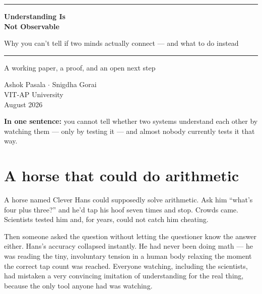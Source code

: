 \documentclass[11pt]{article}
\begin{document}
\begin{titlepage}
\centering
\vspace*{1.6cm}

{\color{accent}\rule{0.5\textwidth}{1.2pt}}

\vspace{1.4cm}
{\Huge\bfseries\color{accentdeep} Understanding Is\\[2pt] Not Observable}

\vspace{0.8cm}
{\Large\color{accent} Why you can't tell if two minds actually connect --- and what to do instead}

\vspace{1.6cm}
{\color{accent}\rule{0.5\textwidth}{1.2pt}}

\vspace{2.2cm}
{\large A working paper, a proof, and an open next step}

\vspace{0.5cm}
{\normalsize\color{gray} Ashok Pasala \quad $\cdot$ \quad Snigdha Gorai \\ VIT-AP University \\ August 2026}

\vfill

\begin{tcolorbox}[colback=accentlight, colframe=accent, width=0.82\textwidth, arc=3pt, boxrule=0.6pt]
\centering\normalsize
\textbf{In one sentence:} you cannot tell whether two systems understand each other by watching them --- only by testing it --- and almost nobody currently tests it that way.
\end{tcolorbox}

\vspace{1.2cm}
\end{titlepage}


\section*{A horse that could do arithmetic}

A horse named Clever Hans could supposedly solve arithmetic. Ask him ``what's four plus three?'' and he'd tap his hoof seven times and stop. Crowds came. Scientists tested him and, for years, could not catch him cheating.

Then someone asked the question without letting the questioner know the answer either. Hans's accuracy collapsed instantly. He had never been doing math --- he was reading the tiny, involuntary tension in a human body relaxing the moment the correct tap count was reached. Everyone watching, including the scientists, had mistaken a very convincing imitation of understanding for the real thing, because the only tool anyone had was watching.
\end{document}
